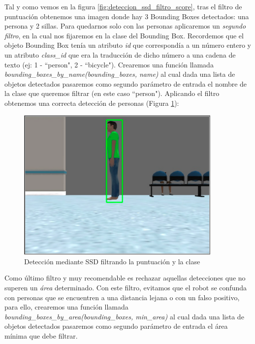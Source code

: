 Tal y como vemos en la figura \ref{fig:deteccion_ssd_filtro_score}, tras el filtro de puntuación obtenemos una imagen donde hay 3 Bounding Boxes detectados: una persona y 2 sillas. Para quedarnos solo con las personas aplicaremos un \textit{segundo filtro}, en la cual nos fijaremos en la clase del Bounding Box. Recordemos que el objeto Bounding Box tenía un atributo \textit{id} que correspondía a un número entero y un atributo \textit{class\_id} que era la traducción de dicho número a una cadena de texto (ej: 1 - ``person", 2 - ``bicycle"). Crearemos una función llamada \textit{bounding\_boxes\_by\_name(bounding\_boxes, name)} al cual dada una lista de objetos detectados pasaremos como segundo parámetro de entrada el nombre de la clase que queremos filtrar (en este caso ``person"). Aplicando el filtro obtenemos una correcta detección de personas (Figura \ref{fig:deteccion_ssd_filtro_score_class}):\\

\begin{figure} [H]
  \begin{center}
    \includegraphics[width=10cm]{imagenes/cap6/deteccion-ssd-filtro-score-class.png}
  \end{center}
  \caption[Detección mediante SSD filtrando la puntuación y la clase]{Detección mediante SSD filtrando la puntuación y la clase}
  \label{fig:deteccion_ssd_filtro_score_class}
\end{figure}

Como último filtro y muy recomendable es rechazar aquellas detecciones que no superen un \textit{área} determinado. Con este filtro, evitamos que el robot se confunda con personas que se encuentren a una distancia lejana o con un falso positivo, para ello, crearemos una función llamada \textit{bounding\_boxes\_by\_area(bounding\_boxes, min\_area)} al cual dada una lista de objetos detectados pasaremos como segundo parámetro de entrada el área mínima que debe filtrar.\\

